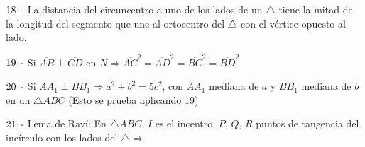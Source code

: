 $ 18\hspace{-0.05cm}\cdot\hspace{-0.05cm}\text{-} $  La distancia del circuncentro a uno de los lados de un $\triangle$ tiene la mitad de la longitud del segmento que une al ortocentro del $\triangle$ con el vértice opuesto al lado.

$ 19\hspace{-0.05cm}\cdot\hspace{-0.05cm}\text{-} $ Si $\overline{AB} \perp \overline{CD}$ en $N \Longrightarrow \overline{AC}^2 = \overline{AD}^2  = \overline{BC}^2 = \overline{BD}^2$

$ 20\hspace{-0.05cm}\cdot\hspace{-0.05cm}\text{-} $ Si $\overline{AA_1} \perp \overline{BB_1} \Longrightarrow a^2 + b^2 = 5c^2$, con $\overline{AA_1}$ mediana de $a$ y $\overline{BB_1}$ mediana de $b$ en un $\triangle ABC$ (Esto se prueba aplicando 19)

$ 21\hspace{-0.05cm}\cdot\hspace{-0.05cm}\text{-} $ Lema de Raví: En $\triangle ABC$, $I$ es el incentro, $P$, $Q$, $R$ puntos de tangencia del incírculo con los lados del $\triangle \Longrightarrow$

